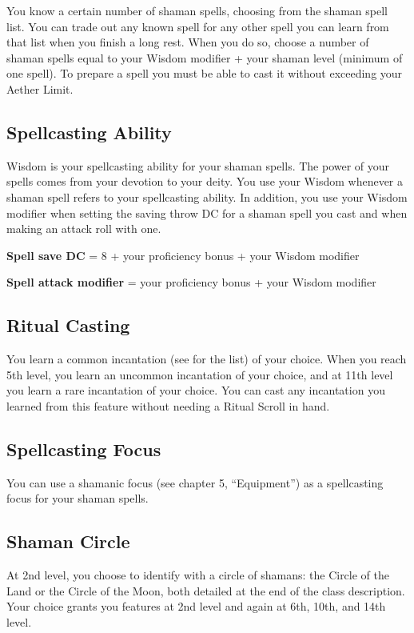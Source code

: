 You know a certain number of shaman spells, choosing from the shaman spell list. You can trade out any known spell for any other spell you can learn from that list when you finish a long rest. When you do so, choose a number of shaman spells equal to your Wisdom modifier + your shaman level (minimum of one spell). To prepare a spell you must be able to cast it without exceeding your Aether Limit.

\subsection{Spellcasting Ability}

Wisdom is your spellcasting ability for your shaman spells. The power of your spells comes from your devotion to your deity. You use your Wisdom whenever a shaman spell refers to your spellcasting ability. In addition, you use your Wisdom modifier when setting the saving throw DC for a shaman spell you cast and when making an attack roll with one.

\textbf{Spell save DC} = 8 + your proficiency bonus + your Wisdom modifier

\textbf{Spell attack modifier} = your proficiency bonus + your Wisdom modifier

\subsection{Ritual Casting}

You learn a common incantation (see  for the list) of your choice. When you reach 5th level, you learn an uncommon incantation of your choice, and at 11th level you learn a rare incantation of your choice. You can cast any incantation you learned from this feature without needing a Ritual Scroll in hand.

\subsection{Spellcasting Focus}

You can use a shamanic focus (see chapter 5, “Equipment”) as a spellcasting focus for your shaman spells.

\subsection{Shaman Circle}

At 2nd level, you choose to identify with a circle of shamans: the Circle of the Land or the Circle of the Moon, both detailed at the end of the class description. Your choice grants you features at 2nd level and again at 6th, 10th, and 14th level.

